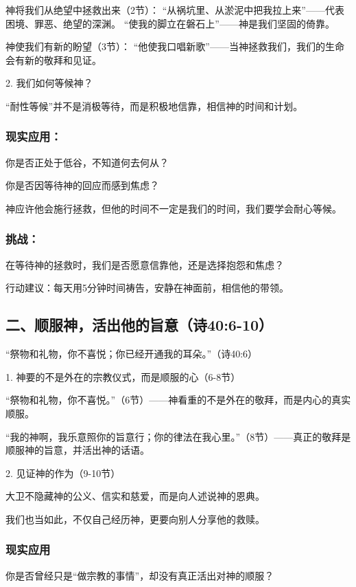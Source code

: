 \documentclass[a4paper, 12pt]{article}
\begin{document}
神将我们从绝望中拯救出来（2节）：
“从祸坑里、从淤泥中把我拉上来”——代表困境、罪恶、绝望的深渊。
“使我的脚立在磐石上”——神是我们坚固的倚靠。

神使我们有新的盼望（3节）：
“他使我口唱新歌”——当神拯救我们，我们的生命会有新的敬拜和见证。

2. 我们如何等候神？

“耐性等候”并不是消极等待，而是积极地信靠，相信神的时间和计划。

\subsubsection*{现实应用：}
\hspace{0.6cm}你是否正处于低谷，不知道何去何从？

你是否因等待神的回应而感到焦虑？

神应许他会施行拯救，但他的时间不一定是我们的时间，我们要学会耐心等候。
\subsubsection*{挑战：}

\hspace{0.6cm}在等待神的拯救时，我们是否愿意信靠他，还是选择抱怨和焦虑？

行动建议：每天用5分钟时间祷告，安静在神面前，相信他的带领。
\subsection*{二、顺服神，活出他的旨意（诗40:6-10）}
“祭物和礼物，你不喜悦；你已经开通我的耳朵。”（诗40:6）

1. 神要的不是外在的宗教仪式，而是顺服的心（6-8节）

“祭物和礼物，你不喜悦。”（6节）——神看重的不是外在的敬拜，而是内心的真实顺服。

“我的神啊，我乐意照你的旨意行；你的律法在我心里。”（8节）——真正的敬拜是顺服神的旨意，并活出神的话语。

2. 见证神的作为（9-10节）

大卫不隐藏神的公义、信实和慈爱，而是向人述说神的恩典。

我们也当如此，不仅自己经历神，更要向别人分享他的救赎。

\subsubsection*{现实应用}
\hspace{0.6cm}你是否曾经只是“做宗教的事情”，却没有真正活出对神的顺服？
\end{document}
